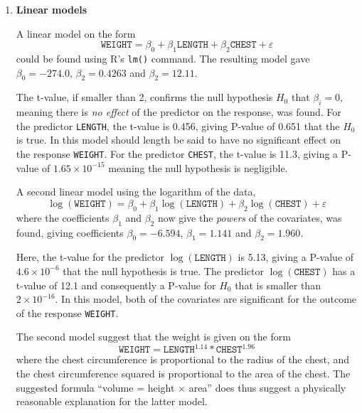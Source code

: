 \documentclass[a4paper,11pt]{article}
\begin{document}
\begin{enumerate}[label=\alph*)]
    \item \textbf{Linear models}
        
        A linear model on the form
        \begin{equation}
        \mathtt{WEIGHT} = \beta_0 + \beta_1 \mathtt{LENGTH} + \beta_2 \mathtt{CHEST} + \varepsilon
            \label{eq:linmod1}
        \end{equation}
        could be found using R's \texttt{lm()} command. The resulting model gave $\beta_0 = -274.0$, $\beta_2 = 0.4263$ and $\beta_2 = 12.11$.

        The t-value, if smaller than 2, confirms the null hypothesis $H_0$ that $\beta_i = 0$, meaning there is \textit{no effect} of the predictor on the  response, was found. For the predictor \texttt{LENGTH}, the t-value is 0.456, giving P-value of 0.651 that the $H_0$ is true. In this model should length be said to have no significant effect on the response \texttt{WEIGHT}. For the predictor \texttt{CHEST}, the t-value is 11.3, giving a P-value of $1.65 \times 10^{-15}$ meaning the null hypothesis is negligible.

        A second linear model using the logarithm of the data,
        \begin{equation}
        \log(\mathtt{WEIGHT}) = \beta_0 + \beta_1 \log(\mathtt{LENGTH}) + \beta_2 \log(\mathtt{CHEST}) + \varepsilon
            \label{eq:linmod2}
        \end{equation}
        where the coefficients $\beta_1$ and $\beta_2$ now give the \textit{powers} of the covariates, was found, giving coefficients $\beta_0 = -6.594$, $\beta_1 = 1.141$ and $\beta_2 = 1.960$.

        Here, the t-value for the predictor $\log(\mathtt{LENGTH})$ is 5.13, giving a P-value of $4.6\times10^{-6}$ that the null hypothesis is true. The predictor $\log(\mathtt{CHEST})$ has a t-value of 12.1 and consequently a P-value for $H_0$ that is smaller than $2\times10^{-16}$. In this model, both of the covariates are significant for the outcome of the response \texttt{WEIGHT}. 

        The second model suggest that the weight is given on the form
        \begin{equation}
            \mathtt{WEIGHT} = \mathtt{LENGTH}^{1.14} * \mathtt{CHEST}^{1.96}
            \label{eq:weightfunc1}
        \end{equation}
        where the chest circumference is proportional to the radius of the chest, and the chest circumference squared is proportional to the area of the chest. The suggested formula ``volume = height $\times$ area'' does thus suggest a physically reasonable explanation for the latter model.


\end{enumerate}
\end{document}
